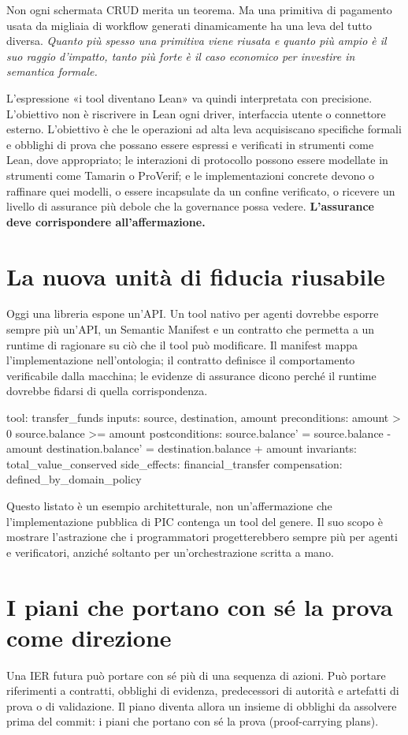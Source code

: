 \documentclass[10pt,oneside,openany]{book}
\begin{document}
Non ogni schermata CRUD merita un teorema. Ma una primitiva di pagamento usata da migliaia di workflow generati dinamicamente ha una leva del tutto diversa. \emph{Quanto più spesso una primitiva viene riusata e quanto più ampio è il suo raggio d'impatto, tanto più forte è il caso economico per investire in semantica formale.}

L'espressione «i tool diventano Lean» va quindi interpretata con precisione. L'obiettivo non è riscrivere in Lean ogni driver, interfaccia utente o connettore esterno. L'obiettivo è che le operazioni ad alta leva acquisiscano specifiche formali e obblighi di prova che possano essere espressi e verificati in strumenti come Lean, dove appropriato; le interazioni di protocollo possono essere modellate in strumenti come Tamarin o ProVerif; e le implementazioni concrete devono o raffinare quei modelli, o essere incapsulate da un confine verificato, o ricevere un livello di assurance più debole che la governance possa vedere. \textbf{L'assurance deve corrispondere all'affermazione.}

\section{La nuova unità di fiducia riusabile}
Oggi una libreria espone un'API. Un tool nativo per agenti dovrebbe esporre sempre più un'API, un Semantic Manifest e un contratto che permetta a un runtime di ragionare su ciò che il tool può modificare. Il manifest mappa l'implementazione nell'ontologia; il contratto definisce il comportamento verificabile dalla macchina; le evidenze di assurance dicono perché il runtime dovrebbe fidarsi di quella corrispondenza.

\begin{codeblock}
tool: transfer_funds
inputs: source, destination, amount
preconditions:
  amount > 0
  source.balance >= amount
postconditions:
  source.balance' = source.balance - amount
  destination.balance' = destination.balance + amount
invariants:
  total_value_conserved
side_effects:
  financial_transfer
compensation:
  defined_by_domain_policy
\end{codeblock}

Questo listato è un esempio architetturale, non un'affermazione che l'implementazione pubblica di PIC contenga un tool del genere. Il suo scopo è mostrare l'astrazione che i programmatori progetterebbero sempre più per agenti e verificatori, anziché soltanto per un'orchestrazione scritta a mano.

\section{I piani che portano con sé la prova come direzione}
Una IER futura può portare con sé più di una sequenza di azioni. Può portare riferimenti a contratti, obblighi di evidenza, predecessori di autorità e artefatti di prova o di validazione. Il piano diventa allora un insieme di obblighi da assolvere prima del commit: i piani che portano con sé la prova (proof-carrying plans).
\end{document}
